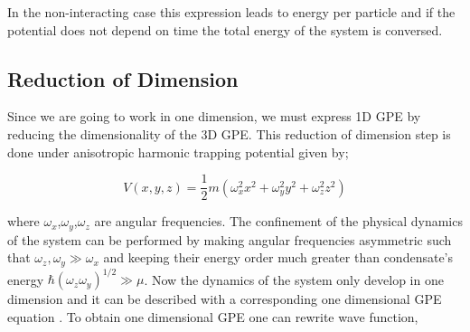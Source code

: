 \documentclass[a4paper,times,hidelinks,12pt]{article}
\begin{document}
\noindent In the non-interacting case this expression leads to energy per particle and if the potential does not depend on time the total energy of the system is conversed. 

 
\subsection{Reduction of Dimension}

Since we are going to work in one dimension, we must express 1D GPE by reducing the dimensionality of the 3D GPE. This reduction of dimension step is done under anisotropic harmonic trapping potential given by;

\begin{equation}
\label{eq:GPE_harmonic_potential}
V(x, y, z) = \frac{1}{2}m(\omega_x^2 x^2 + \omega_y^2y^2 + \omega_z^2z^2)
\end{equation}


\noindent where $\omega_x$,$\omega_y$,$\omega_z$ are angular frequencies. The confinement of the physical dynamics of the system can be performed by making angular frequencies asymmetric such that $\omega_z, \omega_y \gg \omega_x$ and keeping their energy order much greater than condensate's energy $ \hbar(\omega_z \omega_y)^{1/2} \gg \mu $. Now the dynamics of the system only develop in one dimension and it can be described with a corresponding one dimensional GPE equation \cite{barenghi2016primer}. To obtain one dimensional GPE one can rewrite wave function,
\end{document}

